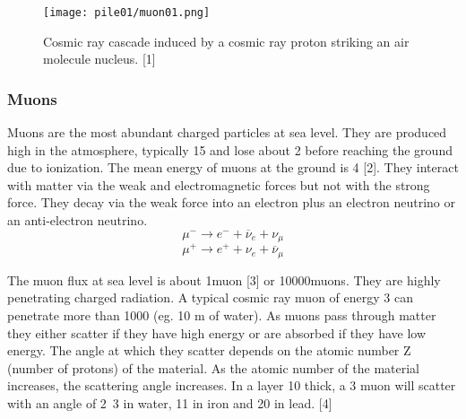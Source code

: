 \documentclass[twocolumn,a4paper]{article}
\begin{document}
\begin{figure}
  \texttt{[image: pile01/muon01.png]}
  \caption{Cosmic ray cascade induced by a cosmic ray proton striking
an air molecule nucleus. [1]}
\end{figure}

\subsubsection{Muons}
Muons are the most abundant charged particles at sea level. They are produced high in the
atmosphere, typically \unit{15}{\kilo\metre} and lose about \unit{2}{\giga\electronvolt} before reaching the ground due to ionization. The
mean energy of muons at the ground is \unit{4}{\giga\electronvolt} [2]. They interact with matter via the weak and
electromagnetic forces but not with the strong force. They decay via the weak force into an electron
plus an electron neutrino or an anti-electron neutrino.
\begin{equation} \mu^- \rightarrow e^- + \overline{\nu}_e + \nu_\mu \end{equation}
\begin{equation} \mu^+ \rightarrow e^+ + \nu_e + \overline{\nu}_\mu \end{equation}

The muon flux at sea level is about \unit{1}{muon\usk\rpsquare{\centi\metre}\usk\reciprocal\minute} [3] or 
\unit{10000}{muons\usk\rpsquare\metre\usk\reciprocal\minute}. They are highly penetrating charged radiation. 
A typical cosmic ray muon of energy \unit{3}{\giga\electronvolt} can penetrate more than 
\unit{1000}{\gram\usk\rpsquare{\centi\metre}} (eg. 10 m of water). As muons pass through matter they either
scatter if they have high energy or are absorbed if they have low energy. The angle at which they
scatter depends on the atomic number Z (number of protons) of the material. As the atomic number
of the material increases, the scattering angle increases. In a layer \unit{10}{\centi\metre} thick, a 
\unit{3}{\giga\electronvolt} muon will scatter with an angle of \unit{2.3}{\milli\radian} in water, 
\unit{11}{\milli\radian} in iron and \unit{20}{\milli\radian} in lead. [4]
\end{document}
